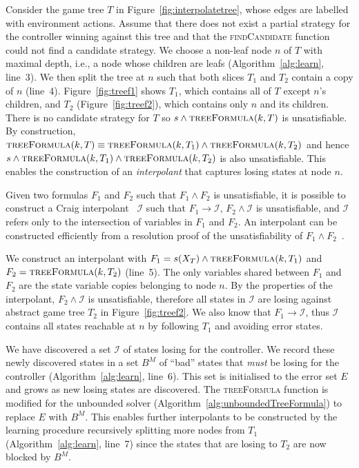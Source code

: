 \documentclass{llncs}
\begin{document}
Consider the game tree $T$ in
Figure~\ref{fig:interpolatetree}, whose edges are labelled with environment
actions.  Assume that there does not exist a partial strategy for the controller
winning against this tree and that the \textsc{findCandidate} function could
not find a candidate strategy. We choose a non-leaf node $n$ of $T$ with
maximal depth, i.e., a node whose children are leafs
(Algorithm~\ref{alg:learn}, line~3). We then split the tree at $n$ such that
both slices $T_1$ and $T_2$ contain a copy of $n$ (line~4).
Figure~\ref{fig:treef1} shows $T_1$, which contains all of $T$ except $n$'s
children, and $T_2$ (Figure~\ref{fig:treef2}), which contains only $n$ and its
children.  There is no candidate strategy for $T$ so $s \land
\textsc{treeFormula}(k, T)$ is unsatisfiable.  By construction,
$\textsc{treeFormula}(k, T) \equiv \textsc{treeFormula}(k, T_1) \land
\textsc{treeFormula}(k, T_2)$ and hence $s \land \textsc{treeFormula}(k, T_1) \land
\textsc{treeFormula}(k, T_2)$ is also unsatisfiable. This enables the construction
of an \emph{interpolant} that captures losing states at node $n$.

Given two formulas $F_1$ and $F_2$ such that $F_1 \land F_2$ is unsatisfiable,
it is possible to construct a Craig interpolant~\cite{craig1957} $\mathcal{I}$
such that $F_1 \to \mathcal{I}$, $F_2 \land \mathcal{I}$ is unsatisfiable, and
$\mathcal{I}$ refers only to the intersection of variables in $F_1$ and $F_2$.
An interpolant can be constructed efficiently from a resolution proof of the
unsatisfiability of $F_1 \land F_2$~\cite{pudlak1997}.

We construct an interpolant with $F_1 = s(X_T) \land \textsc{treeFormula}(k, T_1)$
and $F_2 = \textsc{treeFormula}(k, T_2)$ (line~5). The only variables shared between $F_1$
and $F_2$ are the state variable copies belonging to node $n$. By the properties of the interpolant,
$F_2 \land \mathcal{I}$ is unsatisfiable, therefore all states in $\mathcal{I}$
are losing against abstract game tree $T_2$ in Figure~\ref{fig:treef2}.  We also know that $F_1 \to
\mathcal{I}$, thus $\mathcal{I}$ contains all states reachable at $n$ by
following $T_1$ and avoiding error states.

We have discovered a set $\mathcal{I}$ of states losing for the controller. We
record these newly discovered states in a set $B^M$ of ``bad'' states that
\emph{must} be losing for the controller (Algorithm~\ref{alg:learn}, line~6).
This set is initialised to the error set $E$ and grows as new losing states are
discovered.  The \textsc{treeFormula} function is modified for the unbounded
solver (Algorithm~\ref{alg:unboundedTreeFormula}) to replace $E$ with $B^M$.
This enables further interpolants to be constructed by the learning procedure
recursively splitting more nodes from $T_1$ (Algorithm~\ref{alg:learn}, line~7)
since the states that are losing to $T_2$ are now blocked by $B^M$.
\end{document}
